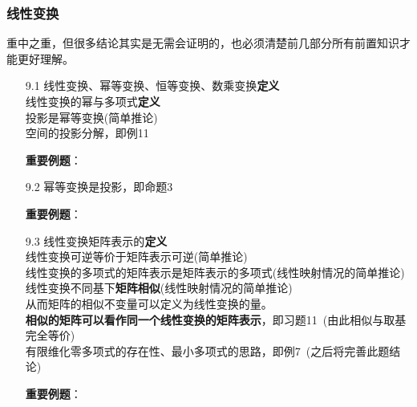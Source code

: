\documentclass[a4paper,UTF8,fontset=windows,AutoFakeBold]{ctexart}
\newcommand*{\note}{\noindent *}
\begin{document}
\subsubsection{线性变换}
重中之重，但很多结论其实是无需会证明的，也必须清楚前几部分所有前置知识才能更好理解。
\begin{enumerate}
    \item[9.1] 线性变换、幂等变换、恒等变换、数乘变换\textbf{定义}
    \\线性变换的幂与多项式\textbf{定义}
    \\投影是幂等变换(简单推论)
    \\空间的投影分解，即例11
    
    \textbf{重要例题}：

    \item[9.2] 幂等变换是投影，即命题3
    
    \textbf{重要例题}：

    \item[9.3] 线性变换矩阵表示的\textbf{定义}
    \\线性变换可逆等价于矩阵表示可逆(简单推论)
    \\线性变换的多项式的矩阵表示是矩阵表示的多项式(线性映射情况的简单推论)
    \\线性变换不同基下\textbf{矩阵相似}(线性映射情况的简单推论)
    \\\note 从而矩阵的相似不变量可以定义为线性变换的量。
    \\\textbf{相似的矩阵可以看作同一个线性变换的矩阵表示}，即习题11\ (由此相似与取基完全等价)
    \\有限维化零多项式的存在性、最小多项式的思路，即例7\ (之后将完善此题结论)

    \textbf{重要例题}：


\end{enumerate}
\end{document}
